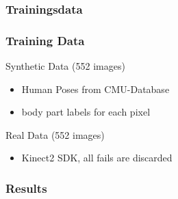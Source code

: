 \documentclass[xcolor=dvipsnames]{beamer}
\begin{document}
\subsubsection{Trainingsdata}
\begin{frame}
	\frametitle{Training Data}
	\Large
	Synthetic Data (552 images)
	\begin{itemize}
		\item Human Poses from CMU-Database \cite{cmuDataset}
		\item body part labels for each pixel
	\end{itemize}
	\vspace{1cm}
	Real Data (552 images)
	\begin{itemize}
		\item Kinect2 SDK, all fails are discarded
	\end{itemize}
\end{frame}

\subsubsection{Results}
\end{document}
